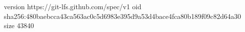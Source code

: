 version https://git-lfs.github.com/spec/v1
oid sha256:480baebcca43ca563ac0c5d6983e395d9a53d4bace4fca80b189f09c82d64a30
size 43840
